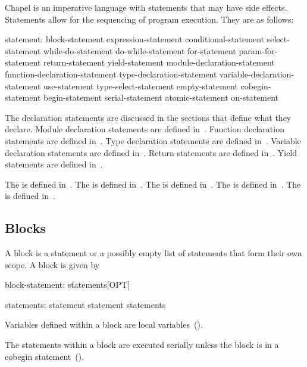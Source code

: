 \label{Statements}


Chapel is an imperative language with statements that may have side
effects.  Statements allow for the sequencing of program execution.
They are as follows:
\begin{syntax}
statement:
  block-statement
  expression-statement
  conditional-statement
  select-statement
  while-do-statement
  do-while-statement
  for-statement
  param-for-statement
  return-statement
  yield-statement
  module-declaration-statement
  function-declaration-statement
  type-declaration-statement
  variable-declaration-statement
  use-statement
  type-select-statement
  empty-statement
  cobegin-statement
  begin-statement
  serial-statement
  atomic-statement
  on-statement
\end{syntax}

The declaration statements are discussed in the sections that define
what they declare.  Module declaration statements are defined
in~.  Function declaration statements are defined
in~.  Type declaration statements are defined
in~.  Variable declaration statements are defined
in~.  Return statements are defined
in~.  Yield statements are defined
in~.

The  is defined in~.
The  is defined in~.
The  is defined in~.
The  is defined in~.
The  is defined in~.

\subsection{Blocks}
\label{Blocks}


A block is a statement or a possibly empty list of statements that
form their own scope.  A block is given by
\begin{syntax}
block-statement:
  { statements[OPT] }
  { }

statements:
  statement
  statement statements
\end{syntax}

Variables defined within a block are local
variables~().

The statements within a block are executed serially unless the block
is in a cobegin statement~().

